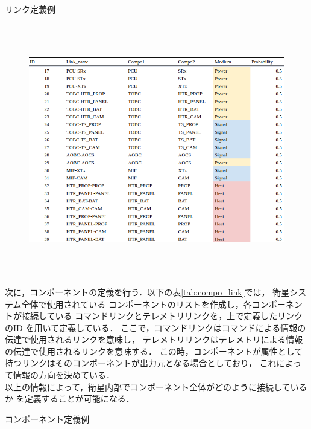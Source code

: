 \documentclass[11pt]{jsreport}
\begin{document}
\begin{table}[H]
   \centering
   \caption{リンク定義例}
   \label{tab:link_definition}
\end{table} 
\vspace{-2zh}
\begin{figure}[H]
   \centering
      \includegraphics[height=11cm]{figure/link_definition.png}
\end{figure}
\newpage
次に，コンポーネントの定義を行う．以下の表\ref{tab:compo_link}では，
衛星システム全体で使用されている
コンポーネントのリストを作成し，各コンポーネントが接続している
コマンドリンクとテレメトリリンクを，上で定義したリンクのID
を用いて定義している．
ここで，コマンドリンクはコマンドによる情報の伝達で使用されるリンクを意味し，
テレメトリリンクはテレメトリによる情報の伝達で使用されるリンクを意味する．
この時，コンポーネントが属性として持つリンクはそのコンポーネントが出力元となる場合としており，
これによって情報の方向を決めている．\\
以上の情報によって，衛星内部でコンポーネント全体がどのように接続しているか
を定義することが可能になる．
\begin{table}[H]
   \centering
   \caption{コンポーネント定義例}
   \label{tab:compo_link}
\end{table}
\vspace{-2zh}
\end{document}
